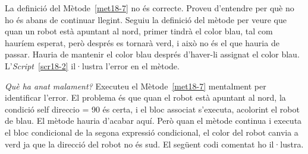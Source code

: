 La definició del Mètode~\ref{met18-7} no és correcte. Proveu d'entendre per què no ho és abans de continuar llegint. Seguiu la definició del mètode per veure que quan un robot està apuntant al nord, primer tindrà el color blau, tal com hauríem esperat, però després es tornarà verd, i això no és el que hauria de passar. Hauria de mantenir el color blau després d'haver-li assignat el color blau. L'\emph{Script}~\ref{scr18-2} il·lustra l'error en el mètode. 

\emph{Què ha anat malament?} Executeu el Mètode~\ref{met18-7} mentalment per identificar l'error. El problema és que quan el robot està apuntant al nord, la condició \textsf{self direccio = 90} és certa, i el bloc associat s'executa, acolorint el robot de blau. El mètode hauria d'acabar aquí. Però quan el mètode continua i executa el bloc condicional de la segona expressió condicional, el color del robot canvia a verd ja que la direcció del robot no és \textsf{sud}. El següent codi comentat ho il·lustra.

